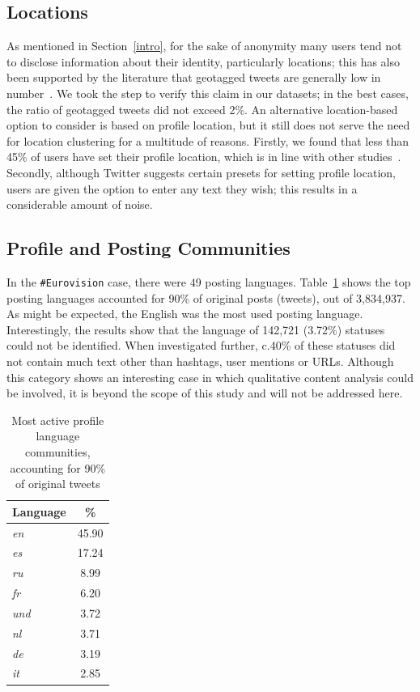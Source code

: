 \documentclass[conference]{IEEEtran}
\begin{document}
\subsection{Locations}\label{locations}

As mentioned in Section~\ref{intro}, for the sake of anonymity many
users tend not to disclose information about their identity,
particularly locations; this has also been supported by the literature
that geotagged tweets are generally low in
number~\cite{kang-et-al:2013}. We took the step to verify this claim
in our datasets; in the best cases, the ratio of geotagged tweets did
not exceed 2\%. An alternative location-based option to consider is
based on profile location, but it still does not serve the need for
location clustering for a multitude of reasons. Firstly, we found that
less than 45\% of users have set their profile location, which is in
line with other studies~\cite{graham-et-al:2014}. Secondly, although
Twitter suggests certain presets for setting profile location, users
are given the option to enter any text they wish; this results in a
considerable amount of noise.

\subsection{Profile and Posting Communities}\label{ppcomm}

In the {\texttt{\#Eurovision}} case, there were 49 posting
languages. Table~\ref{tbl:activelangs} shows the top posting languages
accounted for 90\% of original posts (tweets), out of 3,834,937. As
might be expected, the English was the most used posting
language. Interestingly, the results show that the language of 142,721
(3.72\%) statuses could not be identified. When investigated further,
c.40\% of these statuses did not contain much text other than
hashtags, user mentions or URLs. Although this category shows an
interesting case in which qualitative content analysis could be
involved, it is beyond the scope of this study and will not be
addressed here.


\begin{table}[!htb]
\centering
\begin{tabular}{@{}lc}
\toprule
\textbf{Language} & \textbf{\%} \\ 
\midrule
{\emph{en}} & 45.90 \\
{\emph{es}} & 17.24 \\
{\emph{ru}} & 8.99 \\
{\emph{fr}} & 6.20 \\
{\emph{und}} & 3.72 \\
{\emph{nl}} & 3.71 \\
{\emph{de}} & 3.19 \\
{\emph{it}} & 2.85 \\ 
\bottomrule
\end{tabular}
\caption{Most active profile language
  communities, accounting for 90\% of original tweets}
\label{tbl:activelangs}
\end{table}
\end{document}

